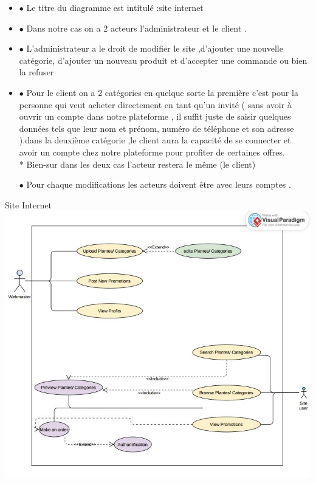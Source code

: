 \documentclass[a4paper,12pt,oneside]{article}
\begin{document}
		\begin{itemize}
        \item[]
         $\bullet$  Le titre du diagramme est intitulé :site internet
    		\item[]
         $\bullet$  Dans notre cas on a 2 acteurs l’administrateur et le client .
         \item[]
         $\bullet$  L’administrateur a le droit de modifier le site ,d'ajouter une nouvelle catégorie, d'ajouter un nouveau produit et d'accepter une commande ou bien la refuser 
         \item[]
         $\bullet$  Pour le client on a 2 catégories en quelque sorte la première c’est pour la personne qui veut acheter directement en tant qu'un invité ( sans avoir à ouvrir un compte dans notre plateforme , il suffit juste  de saisir quelques données tels que leur nom et prénom, numéro de téléphone et son adresse ).dans la deuxième catégorie ,le client aura la capacité de se connecter et avoir un compte chez notre plateforme pour profiter de certaines offres. \\
         
         * Bien-sur dans les deux cas l’acteur restera le même (le client)

         $\bullet$  Pour chaque modifications les acteurs doivent être avec leurs comptes .
         
    		\end{itemize}





\newpage
		
		\begin{center}	
		{Site Internet}
  		\includegraphics[width=1\textwidth]{Use Case Diagram}
		\end{center}
\vskip2mm
\end{document}
